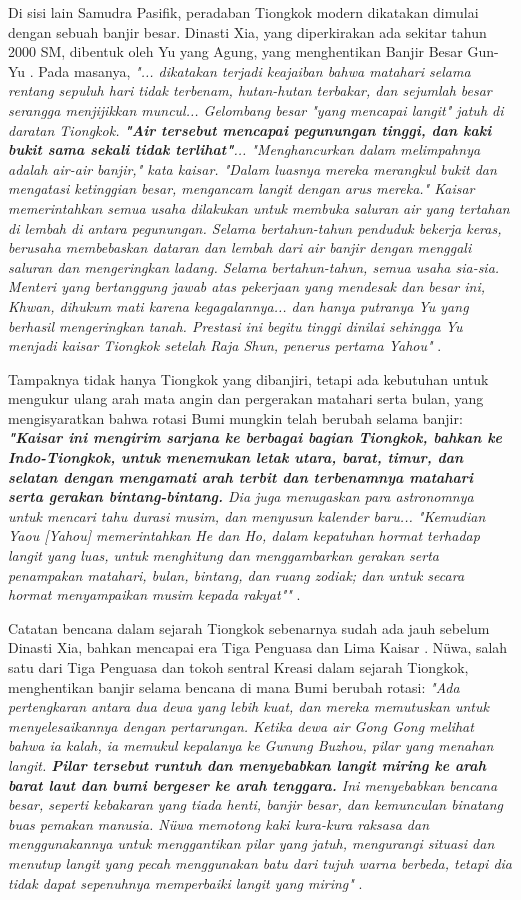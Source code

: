 \documentclass[10pt,twocolumn,letterpaper]{article}
\begin{document}
Di sisi lain Samudra Pasifik, peradaban Tiongkok modern dikatakan dimulai dengan sebuah banjir besar. Dinasti Xia, yang diperkirakan ada sekitar tahun 2000 SM, dibentuk oleh Yu yang Agung, yang menghentikan Banjir Besar Gun-Yu \cite{6}. Pada masanya, \textit{"... dikatakan terjadi keajaiban bahwa matahari selama rentang sepuluh hari tidak terbenam, hutan-hutan terbakar, dan sejumlah besar serangga menjijikkan muncul... Gelombang besar "yang mencapai langit" jatuh di daratan Tiongkok. \textbf{"Air tersebut mencapai pegunungan tinggi, dan kaki bukit sama sekali tidak terlihat"}... "Menghancurkan dalam melimpahnya adalah air-air banjir," kata kaisar. "Dalam luasnya mereka merangkul bukit dan mengatasi ketinggian besar, mengancam langit dengan arus mereka." Kaisar memerintahkan semua usaha dilakukan untuk membuka saluran air yang tertahan di lembah di antara pegunungan. Selama bertahun-tahun penduduk bekerja keras, berusaha membebaskan dataran dan lembah dari air banjir dengan menggali saluran dan mengeringkan ladang. Selama bertahun-tahun, semua usaha sia-sia. Menteri yang bertanggung jawab atas pekerjaan yang mendesak dan besar ini, Khwan, dihukum mati karena kegagalannya... dan hanya putranya Yu yang berhasil mengeringkan tanah. Prestasi ini begitu tinggi dinilai sehingga Yu menjadi kaisar Tiongkok setelah Raja Shun, penerus pertama Yahou"} \cite{5}.

Tampaknya tidak hanya Tiongkok yang dibanjiri, tetapi ada kebutuhan untuk mengukur ulang arah mata angin dan pergerakan matahari serta bulan, yang mengisyaratkan bahwa rotasi Bumi mungkin telah berubah selama banjir: \textit{\textbf{"Kaisar ini mengirim sarjana ke berbagai bagian Tiongkok, bahkan ke Indo-Tiongkok, untuk menemukan letak utara, barat, timur, dan selatan dengan mengamati arah terbit dan terbenamnya matahari serta gerakan bintang-bintang.} Dia juga menugaskan para astronomnya untuk mencari tahu durasi musim, dan menyusun kalender baru... "Kemudian Yaou [Yahou] memerintahkan He dan Ho, dalam kepatuhan hormat terhadap langit yang luas, untuk menghitung dan menggambarkan gerakan serta penampakan matahari, bulan, bintang, dan ruang zodiak; dan untuk secara hormat menyampaikan musim kepada rakyat""} \cite{5}.

Catatan bencana dalam sejarah Tiongkok sebenarnya sudah ada jauh sebelum Dinasti Xia, bahkan mencapai era Tiga Penguasa dan Lima Kaisar \cite{7}. Nüwa, salah satu dari Tiga Penguasa dan tokoh sentral Kreasi dalam sejarah Tiongkok, menghentikan banjir selama bencana di mana Bumi berubah rotasi: \textit{"Ada pertengkaran antara dua dewa yang lebih kuat, dan mereka memutuskan untuk menyelesaikannya dengan pertarungan. Ketika dewa air Gong Gong melihat bahwa ia kalah, ia memukul kepalanya ke Gunung Buzhou, pilar yang menahan langit. \textbf{Pilar tersebut runtuh dan menyebabkan langit miring ke arah barat laut dan bumi bergeser ke arah tenggara.} Ini menyebabkan bencana besar, seperti kebakaran yang tiada henti, banjir besar, dan kemunculan binatang buas pemakan manusia. Nüwa memotong kaki kura-kura raksasa dan menggunakannya untuk menggantikan pilar yang jatuh, mengurangi situasi dan menutup langit yang pecah menggunakan batu dari tujuh warna berbeda, tetapi dia tidak dapat sepenuhnya memperbaiki langit yang miring"} \cite{8}.
\end{document}
